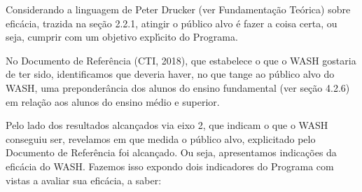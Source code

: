 \documentclass[
12pt,		%
openright,	%
twoside,  %
a4paper,			%
chapter=TITLE,		%
english,			%
french,				%
spanish,			%
brazil				%
]{USPSC-classe/USPSC}
\begin{document}
Considerando a linguagem de Peter Drucker (ver Fundamenta\c{c}\~ao Te\'orica) sobre efic\'acia, trazida na se\c{c}\~ao 2.2.1, atingir o p\'ublico alvo \'e \textquotedbl fazer a coisa certa\textquotedbl , ou seja, cumprir com um objetivo expl\'{\i}cito do Programa.

















No Documento de Refer\^encia  (CTI, 2018), que estabelece \textquotedbl o que o WASH gostaria de ter sido\textquotedbl , identificamos que deveria haver, no que tange ao p\'ublico alvo do WASH, uma preponder\^ancia dos alunos do ensino fundamental (ver se\c{c}\~ao 4.2.6) em rela\c{c}\~ao aos alunos do ensino m\'edio e superior.

















Pelo lado dos resultados alcan\c{c}ados via eixo 2, que indicam \textquotedbl o que o WASH conseguiu ser\textquotedbl , revelamos em que medida o p\'ublico alvo, explicitado pelo  Documento de Refer\^encia foi alcan\c{c}ado. Ou seja, apresentamos indica\c{c}\~oes da efic\'acia do WASH. Fazemos isso expondo dois indicadores do Programa com vistas a avaliar sua efic\'acia, a saber:
\end{document}
